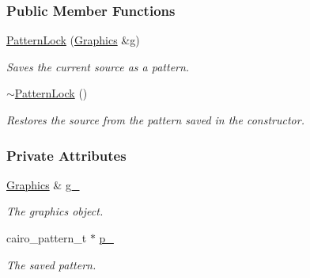 \subsubsection*{Public Member Functions}
\begin{DoxyCompactItemize}
\item 
\hyperlink{structslb_1_1core_1_1ui_1_1PatternLock_aa685f19004b70de18b39f4aec82f9cb2}{Pattern\+Lock} (\hyperlink{structslb_1_1core_1_1ui_1_1Graphics}{Graphics} \&g)\hypertarget{structslb_1_1core_1_1ui_1_1PatternLock_aa685f19004b70de18b39f4aec82f9cb2}{}\label{structslb_1_1core_1_1ui_1_1PatternLock_aa685f19004b70de18b39f4aec82f9cb2}

\begin{DoxyCompactList}\small\item\em Saves the current source as a pattern. \end{DoxyCompactList}\item 
\hyperlink{structslb_1_1core_1_1ui_1_1PatternLock_a34d2e6b47e2e2367ad94dd6bfabb6bd0}{$\sim$\+Pattern\+Lock} ()\hypertarget{structslb_1_1core_1_1ui_1_1PatternLock_a34d2e6b47e2e2367ad94dd6bfabb6bd0}{}\label{structslb_1_1core_1_1ui_1_1PatternLock_a34d2e6b47e2e2367ad94dd6bfabb6bd0}

\begin{DoxyCompactList}\small\item\em Restores the source from the pattern saved in the constructor. \end{DoxyCompactList}\end{DoxyCompactItemize}
\subsubsection*{Private Attributes}
\begin{DoxyCompactItemize}
\item 
\hyperlink{structslb_1_1core_1_1ui_1_1Graphics}{Graphics} \& \hyperlink{structslb_1_1core_1_1ui_1_1PatternLock_a3df1255d5f212b880d608fb2c4d003ce}{g\+\_\+}\hypertarget{structslb_1_1core_1_1ui_1_1PatternLock_a3df1255d5f212b880d608fb2c4d003ce}{}\label{structslb_1_1core_1_1ui_1_1PatternLock_a3df1255d5f212b880d608fb2c4d003ce}

\begin{DoxyCompactList}\small\item\em The graphics object. \end{DoxyCompactList}\item 
cairo\+\_\+pattern\+\_\+t $\ast$ \hyperlink{structslb_1_1core_1_1ui_1_1PatternLock_ac81fe6bf2b263da00294f10df1184027}{p\+\_\+}\hypertarget{structslb_1_1core_1_1ui_1_1PatternLock_ac81fe6bf2b263da00294f10df1184027}{}\label{structslb_1_1core_1_1ui_1_1PatternLock_ac81fe6bf2b263da00294f10df1184027}

\begin{DoxyCompactList}\small\item\em The saved pattern. \end{DoxyCompactList}\end{DoxyCompactItemize}


